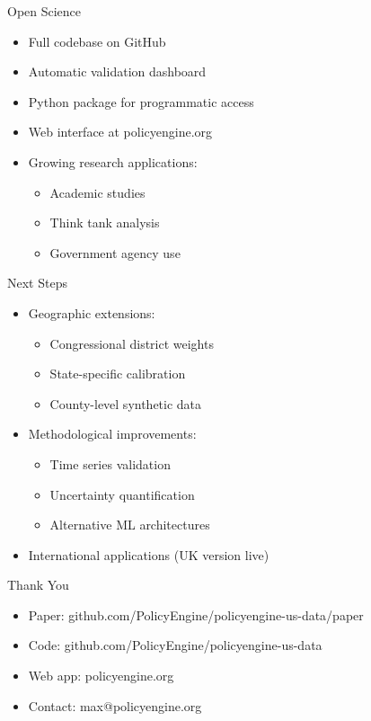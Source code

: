 \documentclass{beamer}
\begin{document}
\begin{frame}{Open Science}
    \begin{itemize}
        \item Full codebase on GitHub
        \item Automatic validation dashboard
        \item Python package for programmatic access
        \item Web interface at policyengine.org
        \item Growing research applications:
        \begin{itemize}
            \item Academic studies
            \item Think tank analysis
            \item Government agency use
        \end{itemize}
    \end{itemize}
\end{frame}

\begin{frame}{Next Steps}
    \begin{itemize}
        \item Geographic extensions:
        \begin{itemize}
            \item Congressional district weights
            \item State-specific calibration
            \item County-level synthetic data
        \end{itemize}
        \item Methodological improvements:
        \begin{itemize}
            \item Time series validation
            \item Uncertainty quantification
            \item Alternative ML architectures
        \end{itemize}
        \item International applications (UK version live)
    \end{itemize}
\end{frame}

\begin{frame}{Thank You}
    \begin{itemize}
        \item Paper: github.com/PolicyEngine/policyengine-us-data/paper
        \item Code: github.com/PolicyEngine/policyengine-us-data
        \item Web app: policyengine.org
        \item Contact: max@policyengine.org
    \end{itemize}
\end{frame}
\end{document}
